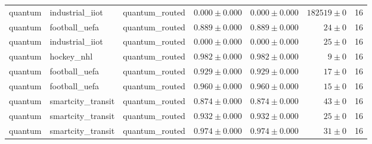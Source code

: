 \begin{table}[htbp]
\begin{tabular}{l l l r r r r}
quantum & industrial\_iiot & quantum\_routed & $0.000\pm0.000$ & $0.000\pm0.000$ & $182519\pm0$ & 16 \\
quantum & football\_uefa & quantum\_routed & $0.889\pm0.000$ & $0.889\pm0.000$ & $24\pm0$ & 16 \\
quantum & industrial\_iiot & quantum\_routed & $0.000\pm0.000$ & $0.000\pm0.000$ & $25\pm0$ & 16 \\
quantum & hockey\_nhl & quantum\_routed & $0.982\pm0.000$ & $0.982\pm0.000$ & $9\pm0$ & 16 \\
quantum & football\_uefa & quantum\_routed & $0.929\pm0.000$ & $0.929\pm0.000$ & $17\pm0$ & 16 \\
quantum & football\_uefa & quantum\_routed & $0.960\pm0.000$ & $0.960\pm0.000$ & $15\pm0$ & 16 \\
quantum & smartcity\_transit & quantum\_routed & $0.874\pm0.000$ & $0.874\pm0.000$ & $43\pm0$ & 16 \\
quantum & smartcity\_transit & quantum\_routed & $0.932\pm0.000$ & $0.932\pm0.000$ & $25\pm0$ & 16 \\
quantum & smartcity\_transit & quantum\_routed & $0.974\pm0.000$ & $0.974\pm0.000$ & $31\pm0$ & 16 \\
\hline
\end{tabular}
\end{table}
